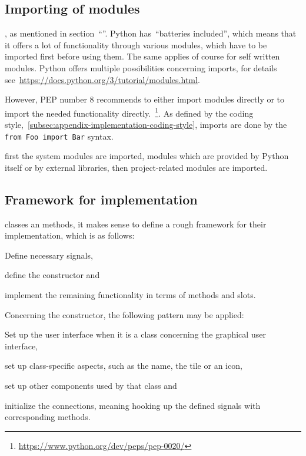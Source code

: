 \documentclass[%
    a4paper,    %
    justified,  %
    nobib,      %
    openany     %
]{tufte-book}
\begin{document}
\subsection{Importing of modules}
\label{appendix:subsec:imports}

, as mentioned
in section~\enquote{}.
Python has~\enquote{batteries included}, which means that it offers a lot of
functionality through various modules, which have to be imported first before
using them. The same applies of course for self written modules. Python offers
multiple possibilities concerning imports, for details
see~\url{https://docs.python.org/3/tutorial/modules.html}. 

However, PEP number 8 recommends to either import modules directly or to import
the needed functionality
directly.~\footnote{\url{https://www.python.org/dev/peps/pep-0020/}}. As defined
by the coding style,~\autoref{subsec:appendix-implementation-coding-style},
imports are done by the \verb+from Foo import Bar+ syntax.

 first the system modules
are imported, modules which are provided by Python itself or by external
libraries, then project-related modules are imported.

\subsection{Framework for implementation}
\label{appendix:subsec:framework}

 classes an methods, it makes
sense to define a rough framework for their implementation, which is as follows:
\begin{enumerate*}
  \item Define necessary signals,
  \item define the constructor and
  \item implement the remaining functionality in terms of methods and slots.
\end{enumerate*}
Concerning the constructor, the following pattern may be applied:
\begin{enumerate*}
  \item Set up the user interface when it is a class concerning the graphical
    user interface,
  \item set up class-specific aspects, such as the name, the tile or an icon,
  \item set up other components used by that class and
  \item initialize the connections, meaning hooking up the defined signals
    with corresponding methods.
\end{enumerate*}
\end{document}
